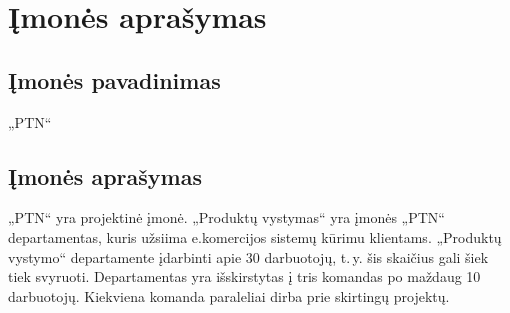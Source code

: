 \section{Įmonės aprašymas}

\subsection{Įmonės pavadinimas}
„PTN“



\subsection{Įmonės aprašymas}


„PTN“ yra projektinė įmonė. „Produktų vystymas“ yra įmonės „PTN“ departamentas, kuris užsiima e.komercijos sistemų kūrimu klientams. „Produktų vystymo“ departamente įdarbinti apie 30 darbuotojų, t.\,y. šis skaičius gali šiek tiek svyruoti. Departamentas yra išskirstytas į tris komandas po maždaug 10 darbuotojų. Kiekviena komanda paraleliai dirba prie skirtingų projektų.

